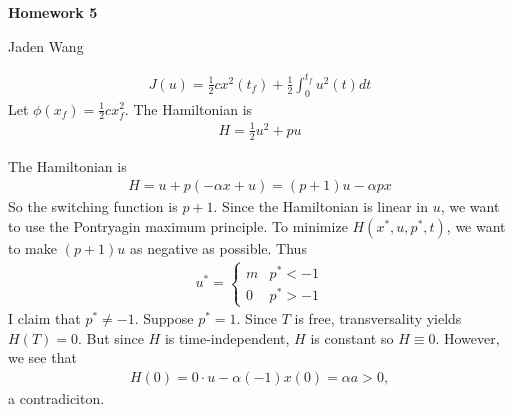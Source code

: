\documentclass[12pt]{article}
\begin{document}
\centerline {\textsf{\textbf{\LARGE{Homework 5}}}}
\centerline {Jaden Wang}
\vspace{.15in}
\begin{problem}[1]
\begin{align*}
	J(u) = \frac{1}{2} cx^2(t_f) + \frac{1}{2} \int_0^{t_f} u^2(t) dt
\end{align*}
Let $ \phi(x_f) = \frac{1}{2}c x_f^2$. The Hamiltonian is
 \begin{align*}
	H =\frac{1}{2} u^2 + p u
\end{align*}
\end{problem}
\begin{problem}[3]
The Hamiltonian is
 \begin{align*}
	H = u +p(- \alpha x+u) = (p+1)u - \alpha p x
\end{align*}
So the switching function is $ p+1$. Since the Hamiltonian is linear in $ u$, we want to use the Pontryagin maximum principle. To minimize $ H(x^* ,u,p^* ,t)$, we want to make  $ (p+1)u$ as negative as possible. Thus
 \begin{align*}
	u^* = \begin{cases}
		m & p^* <-1\\
		0& p^* >-1
	\end{cases}
\end{align*}
I claim that $ p^*  \neq -1$. Suppose $ p^* =1$. Since $ T$ is free, transversality yields  $ H(T) = 0$. But since  $ H$ is time-independent,  $ H$ is constant so  $ H \equiv 0$. However, we see that
 \begin{align*}
	H(0) = 0 \cdot u - \alpha (-1) x(0) = \alpha a >0,
\end{align*}
a contradiciton.


\end{problem}
\end{document}
